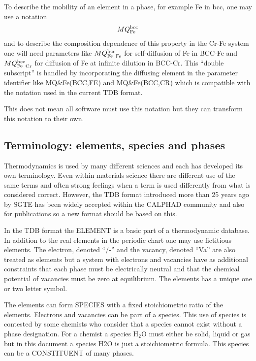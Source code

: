 \documentclass[12pt]{article}
\begin{document}
To describe the mobility of an element in a phase, for example Fe in bcc,
one may use a notation
\begin{eqnarray}
MQ^{\rm bcc}_{\rm Fe} \nonumber
\end{eqnarray}
and to describe the composition dependence of this property in the
Cr-Fe system one will need parameters like ${MQ^{\rm bcc}_{\rm
    Fe}}_{\rm Fe}$ for self-diffusion of Fe in BCC-Fe and ${MQ^{\rm
    bcc}_{\rm Fe}}_{\rm Cr}$ for diffusion of Fe at infinite dilution
in BCC-Cr.  This ``double subscript'' is handled by incorporating the
diffusing element in the parameter identifier like MQ\&Fe(BCC,FE) and
MQ\&Fe(BCC,CR) which is compatible with the notation used in the
current TDB format.

This does not mean all software must use this notation but they can
transform this notation to their own.

\subsection{Terminology: elements, species and phases}

Thermodynamics is used by many different sciences and each has
developed its own terminology.  Even within materials science there
are different use of the same terms and often strong feelings when a
term is used differently from what is considered correct.  However,
the TDB format introduced more than 25 years ago by SGTE has been
widely accepted within the CALPHAD community and also for publications
so a new format should be based on this.

In the TDB format the ELEMENT is a basic part of a thermodynamic
database.  In addition to the real elements in the periodic chart one
may use fictitious elements.  The electron, denoted ``/-'' and the
vacancy, denoted ``Va'' are also treated as elements but a system with
electrons and vacancies have as additional constraints that each phase
must be electrically neutral and that the chemical potential of
vacancies must be zero at equilibrium.  The elements has a unique one
or two letter symbol.

The elements can form SPECIES with a fixed stoichiometric ratio of the
elements.  Electrons and vacancies can be part of a species.  This use
of species is contested by some chemists who consider that a species
cannot exist without a phase designation.  For a chemist a species
H$_2$O must either be solid, liquid or gas but in this document a
species H2O is just a stoichiometric formula.  This species can be a
CONSTITUENT of many phases.
\end{document}
